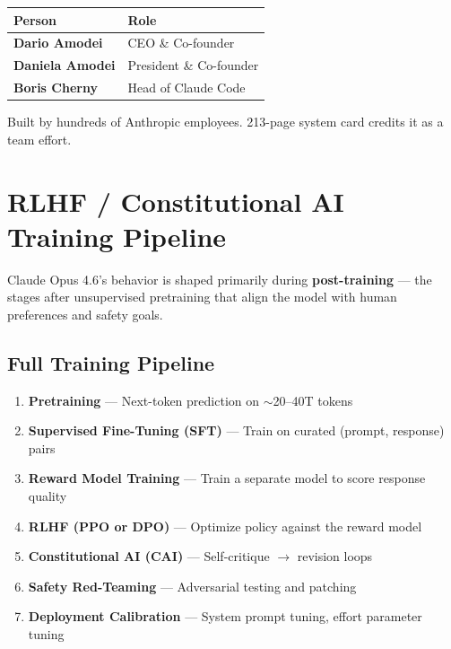 \documentclass[11pt,a4paper]{article}
\begin{document}
\begin{center}
\begin{tabular}{ll}
\toprule
\textbf{Person} & \textbf{Role} \\
\midrule
\textbf{Dario Amodei} & CEO \& Co-founder \\
\textbf{Daniela Amodei} & President \& Co-founder \\
\textbf{Boris Cherny} & Head of Claude Code \\
\bottomrule
\end{tabular}
\end{center}

Built by hundreds of Anthropic employees. 213-page system card credits it as a team effort.

\section{RLHF / Constitutional AI Training Pipeline}

Claude Opus 4.6's behavior is shaped primarily during \textbf{post-training} --- the stages after unsupervised pretraining that align the model with human preferences and safety goals.

\subsection{Full Training Pipeline}

\begin{tcolorbox}[colback=gray!5, colframe=gray!60!black, title={\bfseries Claude Opus 4.6 --- Training Pipeline}]
\begin{enumerate}[itemsep=2pt]
  \item \textbf{Pretraining} --- Next-token prediction on $\sim$20--40T tokens
  \item \textbf{Supervised Fine-Tuning (SFT)} --- Train on curated (prompt, response) pairs
  \item \textbf{Reward Model Training} --- Train a separate model to score response quality
  \item \textbf{RLHF (PPO or DPO)} --- Optimize policy against the reward model
  \item \textbf{Constitutional AI (CAI)} --- Self-critique $\to$ revision loops
  \item \textbf{Safety Red-Teaming} --- Adversarial testing and patching
  \item \textbf{Deployment Calibration} --- System prompt tuning, effort parameter tuning
\end{enumerate}
\end{tcolorbox}
\end{document}
